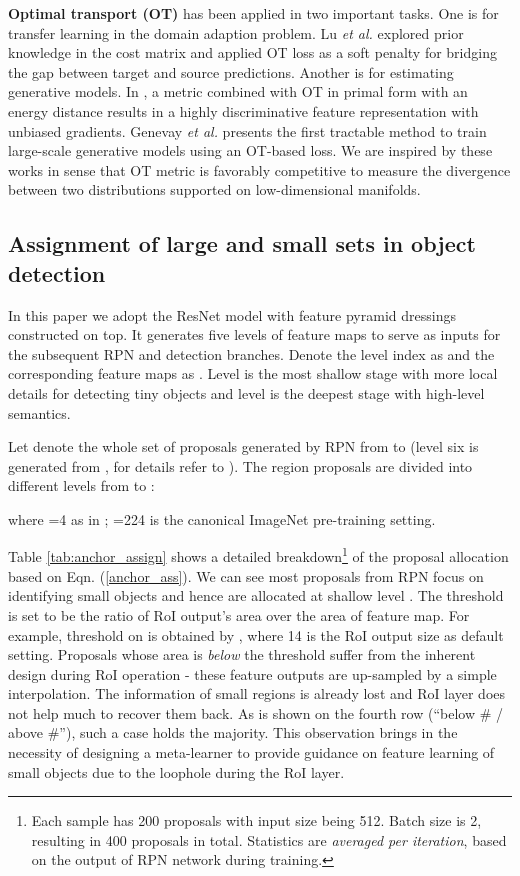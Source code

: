 \documentclass{article} \usepackage{iclr2019_conference,times}
\begin{document}
\textbf{Optimal transport (OT)} has been applied in two important tasks. One is for transfer learning in the domain adaption problem. Lu \textit{et al.} \citep{lu2017ot_transfer_learn} explored prior knowledge in the cost matrix and applied OT loss as a soft penalty for bridging the gap between target and source predictions. Another is for estimating generative models. In \citep{salimans2018improving}, a metric combined with OT in primal form with an energy distance results in a highly discriminative feature representation with unbiased gradients. Genevay \textit{et al.} \citep{genevay2017_sinkhorn_loss} presents the first tractable method to train large-scale generative models using an OT-based loss. We are inspired by these works in sense that OT metric is favorably competitive to measure the divergence between two distributions supported on low-dimensional manifolds.


\subsection{Assignment of large and small sets in object detection}\label{sec:proposal-assignment}
In this paper we adopt the ResNet model \citep{he2016_resnet} with feature pyramid dressings \citep{lin2017_FPN} 
constructed on top. 
It generates five levels
of feature maps to serve as inputs for the subsequent RPN and detection branches. Denote the level index as  and the corresponding feature maps as . Level  is the most shallow stage with more local details for detecting tiny objects and level  is the deepest stage with high-level semantics. 




Let  denote the whole set of proposals generated by RPN from  to  (level six is generated from , for details refer to \citep{lin2017_FPN}).
The region proposals are divided into different levels from  to :

where 
=4 as in \citep{lin2017_FPN}; =224 is the canonical ImageNet pre-training setting.




Table \ref{tab:anchor_assign} shows a detailed breakdown\footnote{Each sample has 200 proposals with input size being 512. Batch size is 2, resulting in 400 proposals in total. Statistics are \textit{averaged per iteration}, based on the output of RPN network during training.} of the proposal allocation based on Eqn. (\ref{anchor_ass}). We can see most proposals from RPN focus on identifying small objects and hence are allocated at shallow level . The threshold is set to be the ratio of RoI output's area over the area of feature map.
For example, threshold on  is obtained by , where 14 is the RoI output size as default setting.
Proposals whose area is \textit{below} the threshold suffer from the inherent design during RoI operation - these feature outputs are up-sampled by a simple interpolation.
The information of small regions is already lost and RoI layer does not help much to recover them back. 
As is shown on the fourth row (``below \# / above \#''), such a case holds the majority. This observation brings in the necessity of designing a meta-learner to provide guidance on feature learning of small objects due to the loophole during the RoI layer.
\end{document}
